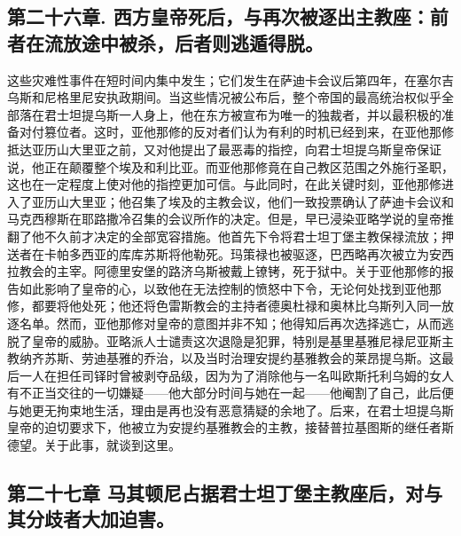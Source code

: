 
\subsection{第二十六章. 西方皇帝死后，与再次被逐出主教座：前者在流放途中被杀，后者则逃遁得脱。}

这些灾难性事件在短时间内集中发生；它们发生在萨迪卡会议后第四年，在塞尔吉乌斯和尼格里尼安执政期间。当这些情况被公布后，整个帝国的最高统治权似乎全部落在君士坦提乌斯一人身上，他在东方被宣布为唯一的独裁者，并以最积极的准备对付篡位者。这时，亚他那修的反对者们认为有利的时机已经到来，在亚他那修抵达亚历山大里亚之前，又对他提出了最恶毒的指控，向君士坦提乌斯皇帝保证说，他正在颠覆整个埃及和利比亚。而亚他那修竟在自己教区范围之外施行圣职，这也在一定程度上使对他的指控更加可信。与此同时，在此关键时刻，亚他那修进入了亚历山大里亚；他召集了埃及的主教会议，他们一致投票确认了萨迪卡会议和马克西穆斯在耶路撒冷召集的会议所作的决定。但是，早已浸染亚略学说的皇帝推翻了他不久前才决定的全部宽容措施。他首先下令将君士坦丁堡主教保禄流放；押送者在卡帕多西亚的库库苏斯将他勒死。玛策禄也被驱逐，巴西略再次被立为安西拉教会的主宰。阿德里安堡的路济乌斯被戴上镣铐，死于狱中。关于亚他那修的报告如此影响了皇帝的心，以致他在无法控制的愤怒中下令，无论何处找到亚他那修，都要将他处死；他还将色雷斯教会的主持者德奥杜禄和奥林比乌斯列入同一放逐名单。然而，亚他那修对皇帝的意图并非不知；他得知后再次选择逃亡，从而逃脱了皇帝的威胁。亚略派人士谴责这次退隐是犯罪，特别是基里基雅尼禄尼亚斯主教纳齐苏斯、劳迪基雅的乔治，以及当时治理安提约基雅教会的莱昂提乌斯。这最后一人在担任司铎时曾被剥夺品级，因为为了消除他与一名叫欧斯托利乌姆的女人有不正当交往的一切嫌疑——他大部分时间与她在一起——他阉割了自己，此后便与她更无拘束地生活，理由是再也没有恶意猜疑的余地了。后来，在君士坦提乌斯皇帝的迫切要求下，他被立为安提约基雅教会的主教，接替普拉基图斯的继任者斯德望。关于此事，就谈到这里。\par


\subsection{第二十七章 马其顿尼占据君士坦丁堡主教座后，对与其分歧者大加迫害。}

